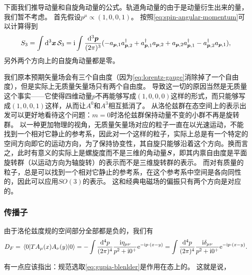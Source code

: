 \documentclass[hyperref, UTF8, a4paper]{ctexart}
\newcommand*{\ii}{\mathrm{i}}
\newcommand*{\ee}{\mathrm{e}}
\begin{document}
下面我们推导动量和自旋角动量的公式。轨道角动量的由于是动量衍生出来的量，我们暂不考虑。
首先假设$p^\mu \propto (1, 0, 0, 1)$。
按照\eqref{eq:spin-angular-momentum}可以计算得到
\[
    {S}_3 = \int \dd[3]{\vb*{x}} \mathcal{S}_3 = \ii \int \frac{\dd[3]{\vb*{p}}}{(2\pi)^3} (- {a}_{\vb*{p},1} {a}^\dagger_{\vb*{p}, 2} + {a}^\dagger_{\vb*{p}, 1} {a}_{\vb*{p}, 2} + {a}_{\vb*{p}, 2} {a}_{\vb*{p}, 1}^\dagger - {a}_{\vb*{p}, 2}^\dagger {a}_{\vb*{p}, 1} ) ,
\]
另外两个方向上的自旋角动量都是零。

我们原本预期矢量场会有三个自由度（因为\eqref{eq:lorentz-gauge}消除掉了一个自由度），但是实际上无质量矢量场只有两个自由度。
导致这一切的原因当然是无质量这个事实——它使得四维动量$p$不再能够写成$(1, 0, 0, 0)$这样的形式，而只能够写成$(1,0,0,1)$这样，从而让$A^0$和$A^3$相互抵消了。
从洛伦兹群在态空间上的表示出发可以更好地看待这个问题：$m=0$时洛伦兹群保持动量不变的小群不再是旋转群。
以一种更加物理的视角，无质量矢量场对应的粒子一直在以光速运动，不能找到一个相对它静止的参考系，因此对一个这样的粒子，实际上总是有一个特定的空间方向即它的运动方向，为了保持协变性，其自旋只能够沿着这个方向。换而言之，此时有意义的实际上是螺旋度而不是三维的角动量${\vb*{S}}$，即其内禀自由度是平面旋转群（以运动方向为轴旋转）的表示而不是三维旋转群的表示。
而对有质量的粒子，总是可以找到一个相对它静止的参考系，在这个参考系中空间是各向同性的，因此可以应用$SO(3)$的表示。
这和经典电磁场的偏振只有两个方向是对应的。



\subsubsection{传播子}

由于洛伦兹度规的空间部分全部都是负的，我们有
\begin{equation}
    D_F = \mel*{0}{T A_{\mu}(x) A_{\nu}(y)}{0} = - \int \frac{\dd[4]{p}}{(2\pi)^4} \frac{\ii \eta_{\mu \nu}}{p^2 + \ii 0^+} \ee^{- \ii p \cdot (x - y)} = \int \frac{\dd[4]{p}}{(2\pi)^4} \frac{\ii \delta_{\mu \nu}}{p^2 + \ii 0^+} \ee^{- \ii p \cdot (x - y)}.
\end{equation}

有一点应该指出：规范选取\eqref{eq:gupia-blenlder}是作用在态上的。
这就是说，%
\end{document}

